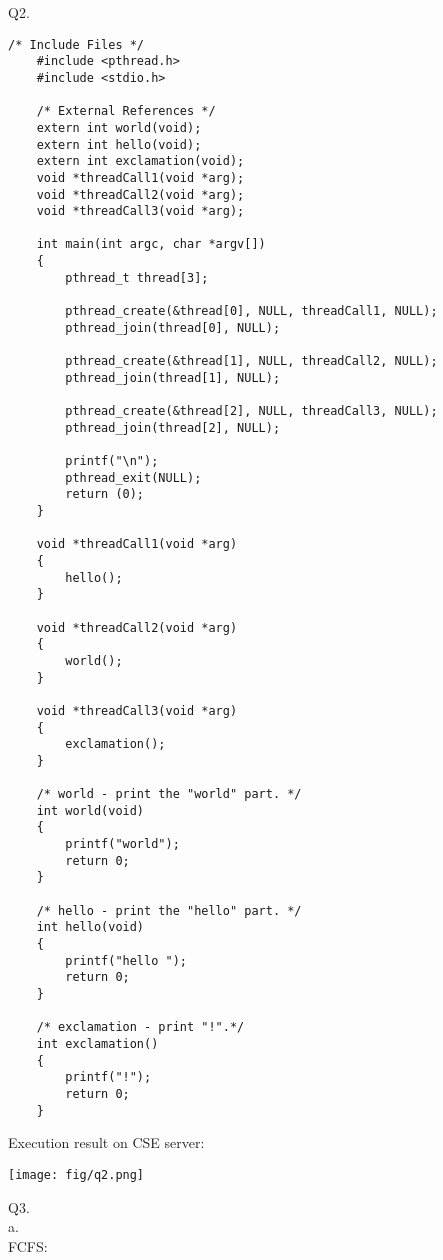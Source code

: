 \documentclass[a4paper, tikz, border=10pt]{article}
\begin{document}
Q2. \\
\begin{lstlisting}[style=CStyle]
    /* Include Files */
    #include <pthread.h>
    #include <stdio.h>
    
    /* External References */
    extern int world(void);
    extern int hello(void);
    extern int exclamation(void);
    void *threadCall1(void *arg);
    void *threadCall2(void *arg);
    void *threadCall3(void *arg);
    
    int main(int argc, char *argv[])
    {
        pthread_t thread[3];
    
        pthread_create(&thread[0], NULL, threadCall1, NULL);
        pthread_join(thread[0], NULL);
    
        pthread_create(&thread[1], NULL, threadCall2, NULL);
        pthread_join(thread[1], NULL);
    
        pthread_create(&thread[2], NULL, threadCall3, NULL);
        pthread_join(thread[2], NULL);
    
        printf("\n");
        pthread_exit(NULL);
        return (0);
    }
    
    void *threadCall1(void *arg)
    {
        hello();
    }
    
    void *threadCall2(void *arg)
    {
        world();
    }
    
    void *threadCall3(void *arg)
    {
        exclamation();
    }
    
    /* world - print the "world" part. */
    int world(void)
    {
        printf("world");
        return 0;
    }
    
    /* hello - print the "hello" part. */
    int hello(void)
    {
        printf("hello ");
        return 0;
    }
    
    /* exclamation - print "!".*/
    int exclamation()
    {
        printf("!");
        return 0;
    }
\end{lstlisting}

Execution result on CSE server:\\

\centerline{\texttt{[image: fig/q2.png]}}

Q3.\\
a.\\
FCFS:\\
\end{document}
